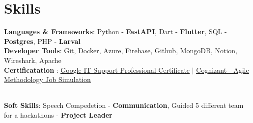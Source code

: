 \documentclass[letterpaper,11pt]{article}
\begin{document}
\section{Skills}
 \begin{itemize}[leftmargin=0.15in, label={}]
    \small{\item{
     \textbf{Languages \& Frameworks}{: Python {-} \textbf{FastAPI}, Dart {-} {\textbf{Flutter}}, SQL {-} \textbf{Postgres}, PHP {-} \textbf{Larval} } \\
     \textbf{Developer Tools}{: Git, Docker, Azure,  Firebase, Github, MongoDB, Notion, Wireshark, Apache } \\
     \textbf{Certificatation} {: \href{https://www.coursera.org/account/accomplishments/specialization/X5TCHMVA7LTY}{\underline{Google IT Support Professional Certificate}} $|$ \href{https://forage-uploads-prod.s3.amazonaws.com/completion-certificates/Cognizant/ZZswQd6xGydd758vz_Cognizant_LuZL3JgZyTqMY4cjF_1701065263350_completion_certificate.pdf}{\underline{Cognizant {-} Agile Methodology Job Simulation} }}
    }}  \\
    \textbf{Soft Skills}: {Speech Compedetion} {-} \textbf{Communication}, {Guided 5 different team for a hackathons} {-} \textbf{Project Leader}
  \end{itemize}
\end{document}
